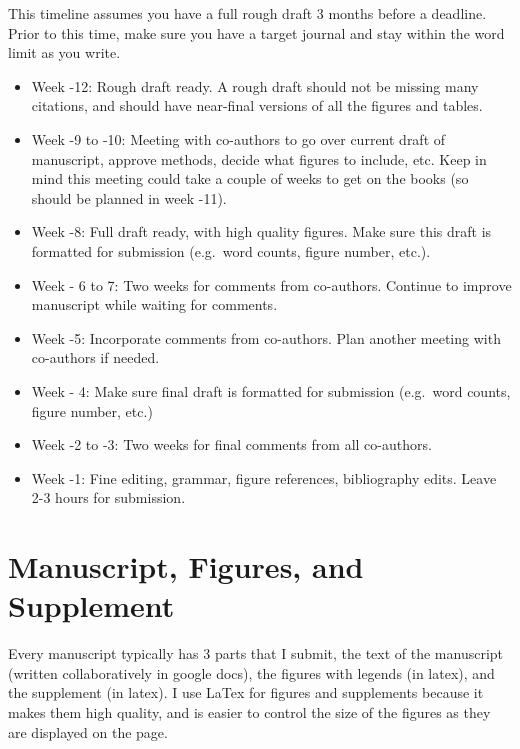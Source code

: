 \documentclass[
  letterpaper,
  DIV=11,
  numbers=noendperiod]{scrreprt}
\begin{document}
This timeline assumes you have a full rough draft 3 months before a
deadline. Prior to this time, make sure you have a target journal and
stay within the word limit as you write.

\begin{itemize}
\item
  Week -12: Rough draft ready. A rough draft should not be missing many
  citations, and should have near-final versions of all the figures and
  tables.
\item
  Week -9 to -10: Meeting with co-authors to go over current draft of
  manuscript, approve methods, decide what figures to include, etc. Keep
  in mind this meeting could take a couple of weeks to get on the books
  (so should be planned in week -11).
\item
  Week -8: Full draft ready, with high quality figures. Make sure this
  draft is formatted for submission (e.g.~word counts, figure number,
  etc.).
\item
  Week - 6 to 7: Two weeks for comments from co-authors. Continue to
  improve manuscript while waiting for comments.
\item
  Week -5: Incorporate comments from co-authors. Plan another meeting
  with co-authors if needed.
\item
  Week - 4: Make sure final draft is formatted for submission (e.g.~word
  counts, figure number, etc.)
\item
  Week -2 to -3: Two weeks for final comments from all co-authors.
\item
  Week -1: Fine editing, grammar, figure references, bibliography edits.
  Leave 2-3 hours for submission.
\end{itemize}

\hypertarget{manuscript-figures-and-supplement}{%
\section*{\texorpdfstring{\textbf{Manuscript, Figures, and
Supplement}}{Manuscript, Figures, and Supplement}}\label{manuscript-figures-and-supplement}}

Every manuscript typically has 3 parts that I submit, the text of the
manuscript (written collaboratively in google docs), the figures with
legends (in latex), and the supplement (in latex). I use LaTex for
figures and supplements because it makes them high quality, and is
easier to control the size of the figures as they are displayed on the
page.
\end{document}
